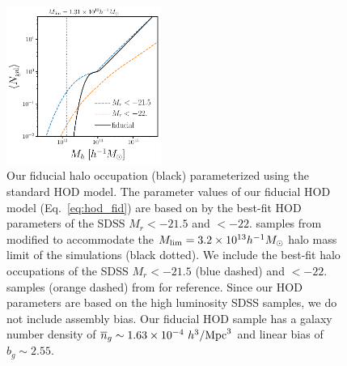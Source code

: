 \begin{figure}
\begin{center}
    \includegraphics[width=0.45\textwidth]{figs/hod_fid.pdf} 
    \caption{Our fiducial halo occupation (black) parameterized using the
    standard \cite{zheng2007} HOD model. The parameter values of our fiducial
    HOD model (Eq.~\ref{eq:hod_fid}) are based on by the best-fit HOD
    parameters of the SDSS $M_r < -21.5$ and $< -22.$ samples from
    \cite{zheng2007} modified to accommodate the $M_{\rm lim} = 3.2\times
    10^{13} h^{-1}M_\odot$ halo mass limit of the \quij simulations (black
    dotted). We include the best-fit halo occupations of the SDSS  $M_r <
    -21.5$ (blue dashed) and $< -22.$ samples (orange dashed) from
    \cite{zheng2007} for reference. Since our HOD parameters are based on the
    high luminosity SDSS samples, we do not include assembly bias.  Our
    fiducial HOD sample has a galaxy number density of $\overline{n}_g \sim
    1.63\times10^{-4}~h^3/{\rm Mpc}^3$ and linear bias of $b_g \sim 2.55$.
    }\label{fig:hod}
\end{center}
\end{figure}

